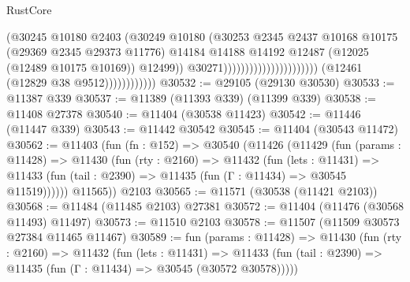 \begin{lexlean}{RustCore}
\begin{coremodule}
                                                                  (@30245
                                                                    @10180
                                                                    @2403
                                                                    (@30249
                                                                      @10180
                                                                      (@30253
                                                                        @2345
                                                                        @2437
                                                                        @10168
                                                                        @10175
                                                                        (@29369 @2345 @29373 @11776)
                                                                        @14184
                                                                        @14188
                                                                        @14192
                                                                        @12487
                                                                        (@12025
                                                                          (@12489 @10175 @10169))
                                                                        @12499))
                                                                    @30271))))))))))))))))))))))
                        (@12461 (@12829 @38 @9512))))))))))))
@30532 := @29105 (@29130 @30530)
@30533 := @11387 @339
@30537 := @11389 (@11393 @339) (@11399 @339)
@30538 := @11408 @27378
@30540 := @11404 (@30538 @11423)
@30542 := @11446 (@11447 @339)
@30543 := @11442 @30542
@30545 := @11404 (@30543 @11472)
@30562 := @11403
    (fun (fn : @152) =>
    @30540
      (@11426
        (@11429
          (fun (params : @11428) =>
          @11430
            (fun (rty : @2160) =>
            @11432
              (fun (lets : @11431) =>
              @11433 (fun (tail : @2390) => @11435 (fun (Γ : @11434) => @30545 @11519))))))
        @11565))
    @2103
@30565 := @11571 (@30538 (@11421 @2103))
@30568 := @11484 (@11485 @2103) @27381
@30572 := @11404 (@11476 (@30568 @11493) @11497)
@30573 := @11510 @2103
@30578 := @11507 (@11509 @30573 @27384 @11465 @11467)
@30589 := fun (params : @11428) =>
  @11430
    (fun (rty : @2160) =>
    @11432
      (fun (lets : @11431) =>
      @11433 (fun (tail : @2390) => @11435 (fun (Γ : @11434) => @30545 (@30572 @30578)))))

\end{coremodule}
\end{lexlean}
